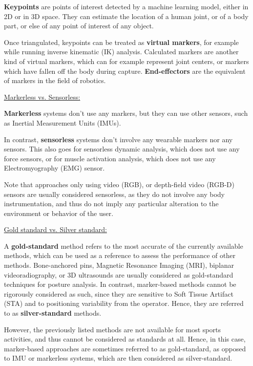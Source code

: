 \textbf{Keypoints} are points of interest detected by a machine learning model, either in 2D or in 3D space. They can estimate the location of a human joint, or of a body part, or else of any point of interest of any object. 

Once triangulated, keypoints can be treated as \textbf{virtual markers}, for example while running inverse kinematic (IK) analysis. Calculated markers are another kind of virtual markers, which can for example represent joint centers, or markers which have fallen off the body during capture. \textbf{End-effectors} are the equivalent of markers in the field of robotics.

\vspace*{0.5cm}

\noindent\underline{Markerless vs. Sensorless:}

\textbf{Markerless} systems don't use any markers, but they can use other sensors, such as Inertial Measurement Units (IMUs). 

In contrast, \textbf{sensorless} systems don't involve any wearable markers nor any sensors. This also goes for sensorless dynamic analysis, which does not use any force sensors, or for muscle activation analysis, which does not use any Electromyography (EMG) sensor. 

Note that approaches only using video (RGB), or depth-field video (RGB-D) sensors are usually considered sensorless, as they do not involve any body instrumentation, and thus do not imply any particular alteration to the environment or behavior of the user.

\vspace*{0.5cm}

\noindent\underline{Gold standard vs. Silver standard:}

A \textbf{gold-standard} method refers to the most accurate of the currently available methods, which can be used as a reference to assess the performance of other methods. Bone-anchored pins, Magnetic Resonance Imaging (MRI), biplanar videoradiography, or 3D ultrasounds are usually considered as gold-standard techniques for posture analysis. In contrast, marker-based methods cannot be rigorously considered as such, since they are sensitive to Soft Tissue Artifact (STA) and to positioning variability from the operator. Hence, they are referred to as \textbf{silver-standard} methods. 

However, the previously listed methods are not available for most sports activities, and thus cannot be considered as standards at all. Hence, in this case, marker-based approaches are sometimes referred to as gold-standard, as opposed to IMU or markerless systems, which are then considered as silver-standard.

